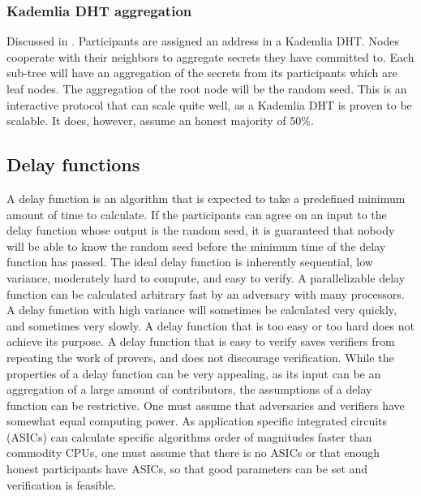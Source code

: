 \subsubsection{Kademlia DHT aggregation}
Discussed in \cite{grumbach_distributed_2017}. Participants are assigned an address in a Kademlia DHT. Nodes cooperate with their neighbors to aggregate secrets they have committed to. Each sub-tree will have an aggregation of the secrets from its participants which are leaf nodes. The aggregation of the root node will be the random seed. 
This is an interactive protocol that can scale quite well, as a Kademlia DHT is proven to be scalable. It does, however, assume an honest majority of 50\%. 

\subsection{Delay functions}
A delay function is an algorithm that is expected to take a predefined minimum amount of time to calculate. If the participants can agree on an input to the delay function whose output is the random seed, it is guaranteed that nobody will be able to know the random seed before the minimum time of the delay function has passed. The ideal delay function is inherently sequential, low variance, moderately hard to compute, and easy to verify. A parallelizable delay function can be calculated arbitrary fast by an adversary with many processors. A delay function with high variance will sometimes be calculated very quickly, and sometimes very slowly. A delay function that is too easy or too hard does not achieve its purpose. A delay function that is easy to verify saves verifiers from repeating the work of provers, and does not discourage verification.
While the properties of a delay function can be very appealing, as its input can be an aggregation of a large amount of contributors, the assumptions of a delay function can be restrictive. One must assume that adversaries and verifiers have somewhat equal computing power. As application specific integrated circuits (ASICs) can calculate specific algorithms order of magnitudes faster than commodity CPUs, one must assume that there is no ASICs or that enough honest participants have ASICs, so that good parameters can be set and verification is feasible. 

